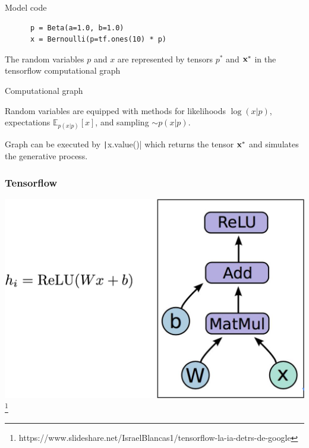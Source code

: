 \documentclass[10pt]{beamer}
\begin{document}
\begin{frame}[fragile]
  \inputminted{python}{python/beta-bernoulli.py}
\end{frame}

\begin{frame}[fragile]
  \begin{block}{Model code}
    \begin{verbatim}
      p = Beta(a=1.0, b=1.0)
      x = Bernoulli(p=tf.ones(10) * p)
    \end{verbatim}
  \end{block}
  The random variables $p$ and $x$ are represented by tensors $p^*$ and $\boldsymbol{\mathbf{x}}^*$ in the tensorflow computational graph
  \begin{block}{Computational graph}
    \begin{center}
      
    \end{center}
  \end{block}
  Random variables are equipped with methods for likelihoods $\log(x|p)$,
  expectations $\mathbb{E}_{p(x|p)}[x]$, and sampling $\sim p(x|p)$.

  Graph can be executed by \texttt|x.value()| which returns the tensor $\boldsymbol{\mathbf{x}}^*$ and simulates the
  generative process.
\end{frame}


\begin{frame}[fragile]
  \frametitle{Tensorflow}
  \includegraphics[width=\textwidth]{img/tensorflow}
  \footnote{https://www.slideshare.net/IsraelBlancas1/tensorflow-la-ia-detrs-de-google}
\end{frame}
\end{document}
